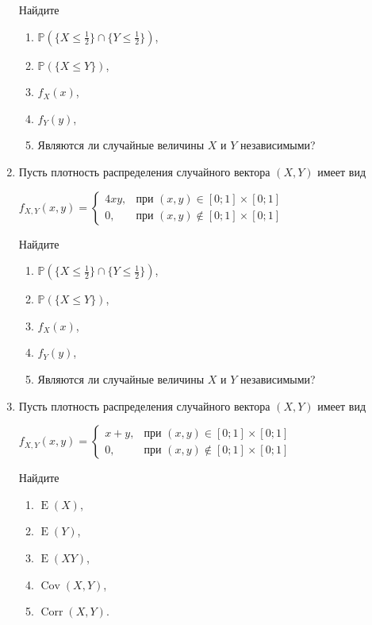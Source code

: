 \documentclass[12pt]{article}
\DeclareMathOperator{\Cov}{Cov}
\DeclareMathOperator{\Corr}{Corr}
\DeclareMathOperator{\E}{E}
\def \P{\mathbb{P}}
\begin{document}
\begin{enumerate}
Найдите  
\begin{enumerate}
\item $\P(\{X \leq \frac{1}{2}\} \cap\{Y \leq \frac{1}{2}\})$,  
\item $\P(\{X\leq Y\})$,  
\item $f_{X}(x)$,  
\item $f_{Y}(y)$,  
\item Являются ли случайные величины $X$ и $Y$ независимыми?
\end{enumerate}

\item Пусть плотность распределения случайного вектора $(X,Y)$ имеет вид
\begin{center} $f_{X,Y}(x,y) = \begin{cases} 4xy, & \mbox{при } (x,y) \in [0;1] \times [0;1] \\ 0 , & \mbox{при } (x,y) \not\in [0;1] \times [0;1] \end{cases}$  \end{center}

Найдите  
\begin{enumerate}
\item $\P(\{X \leq \frac{1}{2}\} \cap \{Y \leq \frac{1}{2}\})$,  
\item $\P(\{X\leq Y\})$,  
\item $f_{X}(x)$,  
\item $f_{Y}(y)$,  
\item Являются ли случайные величины $X$ и $Y$ независимыми?  
\end{enumerate}

\item Пусть плотность распределения случайного вектора $(X,Y)$ имеет вид
\begin{center} $f_{X,Y}(x,y) = \begin{cases} x+y, & \mbox{при } (x,y) \in [0;1] \times [0;1] \\ 0 , & \mbox{при } (x,y) \not\in [0;1] \times [0;1] \end{cases}$  \end{center}

Найдите  
\begin{enumerate}
\item $\E(X)$,  
\item $\E(Y)$,  
\item $\E(XY)$,  
\item $\Cov(X,Y)$,  
\item $\Corr(X,Y)$.  
\end{enumerate}


\end{enumerate}
\end{document}
